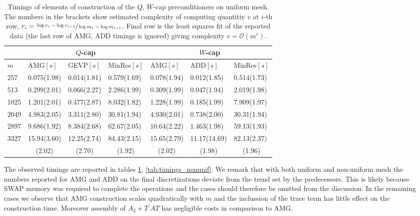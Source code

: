 \documentclass[10pt, a4paper]{article}
\newcommand{\dual}[1]{\ensuremath{{#1}^{\prime}}}
\begin{document}
\begin{table}[h]
  \caption{Timings of elements of construction of the $Q$, $W$-cap
  preconditioners on uniform mesh. The numbers in the brackets show 
  estimated complexity of computing quantitiy $v$ at $i$-th row,
  $r_i=\sfrac{\log{v_i}-\log{v_{i-1}}}{\log{m_i}-\log{m_{i-1}}}$. Final row is
  the least squares fit of the reported data (the last row of AMG, ADD
  timings is ignored) giving complexity $v=\mathcal{O}(m^r)$.
}
\label{tab:timings_unif}
\footnotesize{
\begin{tabular}{l|lll|lll}
\hline
 & \multicolumn{3}{c|}{$Q$-cap} & \multicolumn{3}{c}{$W$-cap}\\
\hline
  $m$ & AMG$\left[s\right]$ & GEVP$\left[s\right]$ & MinRes$\left[s\right]$ &
        AMG$\left[s\right]$ & ADD$\left[s\right]$  & MinRes$\left[s\right]$ \\
\hline
  257  & 0.075(1.98)  & 0.014(1.81)  &  0.579(1.69)  & 0.078(1.94)  & 0.012(1.85)   & 0.514(1.73)  \\
  513  & 0.299(2.01)  & 0.066(2.27)  &  2.286(1.99)  & 0.309(1.99)  & 0.047(1.94)   & 2.019(1.98)  \\
  1025 & 1.201(2.01)  & 0.477(2.87)  &  8.032(1.82)  & 1.228(1.99)  & 0.185(1.99)   & 7.909(1.97)  \\
  2049 & 4.983(2.05)  & 3.311(2.80)  &  30.81(1.94)  & 4.930(2.01)  & 0.738(2.00)   & 30.31(1.94) \\
  2897 & 9.686(1.92)  & 8.384(2.68)  &  62.67(2.05)  & 10.64(2.22)  & 1.463(1.98)   & 59.13(1.93) \\
  3327 & 15.94(3.60)  & 12.25(2.74)  &  84.43(2.15)  & 15.65(2.79)  & 11.17(14.69)  & 82.13(2.37) \\
\hline
  & \multicolumn{1}{c}{(2.02)} & \multicolumn{1}{c}{(2.70)} & \multicolumn{1}{c|}{(1.92)} &
    \multicolumn{1}{c}{(2.02)} & \multicolumn{1}{c}{(1.98)} & \multicolumn{1}{c}{(1.96)} \\
\hline
\end{tabular}
}
\end{table}
%
The observed timings are reported in tables \ref{tab:timings_unif},
\ref{tab:timings_nonunif}. We remark that with both uniform and non-uniform 
mesh the numbers reported for AMG and ADD on the final discretizations deviate 
from the trend set by the predecessors. This is likely because SWAP memory was 
required to complete the operations and the cases should therefore be omitted 
from the discussion. In the remaining cases we observe that AMG construction 
scales quadratically with $m$ and the inclussion of the trace term has little effect 
on the construction time. Moreover assembly of $A_2+\dual{T}AT$ has negligible 
costs in comparison to AMG.
\end{document}
